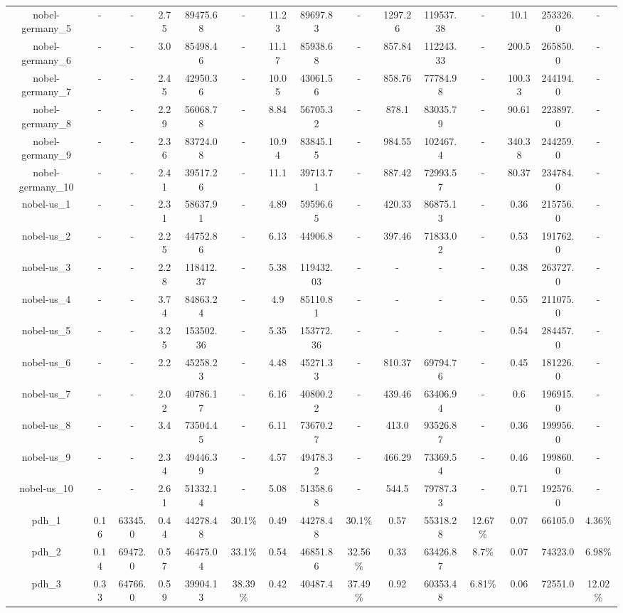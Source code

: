 \documentclass[main.tex]{subfiles}
\begin{document}
\begin{landscape}
\begin{table}[h]
{\begin{tabular}{c|cc|ccc|ccc|ccc|ccc}
	nobel-germany\_5 &- &- &2.75 &89475.68 &- &11.23 &89697.83 &- &1297.26 &119537.38 &- &10.1 &253326.0 &-\\
	nobel-germany\_6 &- &- &3.0 &85498.46 &- &11.17 &85938.68 &- &857.84 &112243.33 &- &200.5 &265850.0 &-\\
	nobel-germany\_7 &- &- &2.45 &42950.36 &- &10.05 &43061.56 &- &858.76 &77784.98 &- &100.33 &244194.0 &-\\
	nobel-germany\_8 &- &- &2.29 &56068.78 &- &8.84 &56705.32 &- &878.1 &83035.79 &- &90.61 &223897.0 &-\\
	nobel-germany\_9 &- &- &2.36 &83724.08 &- &10.94 &83845.15 &- &984.55 &102467.4 &- &340.38 &244259.0 &-\\
	nobel-germany\_10 &- &- &2.41 &39517.26 &- &11.1 &39713.71 &- &887.42 &72993.57 &- &80.37 &234784.0 &-\\
	nobel-us\_1 &- &- &2.31 &58637.91 &- &4.89 &59596.65 &- &420.33 &86875.13 &- &0.36 &215756.0 &-\\
	nobel-us\_2 &- &- &2.25 &44752.86 &- &6.13 &44906.8 &- &397.46 &71833.02 &- &0.53 &191762.0 &-\\
	nobel-us\_3 &- &- &2.28 &118412.37 &- &5.38 &119432.03 &- &- &- &- &0.38 &263727.0 &-\\
	nobel-us\_4 &- &- &3.74 &84863.24 &- &4.9 &85110.81 &- &- &- &- &0.55 &211075.0 &-\\
	nobel-us\_5 &- &- &3.25 &153502.36 &- &5.35 &153772.36 &- &- &- &- &0.54 &284457.0 &-\\
	nobel-us\_6 &- &- &2.2 &45258.23 &- &4.48 &45271.33 &- &810.37 &69794.76 &- &0.45 &181226.0 &-\\
	nobel-us\_7 &- &- &2.02 &40786.17 &- &6.16 &40800.22 &- &439.46 &63406.94 &- &0.6 &196915.0 &-\\
	nobel-us\_8 &- &- &3.4 &73504.45 &- &6.11 &73670.27 &- &413.0 &93526.87 &- &0.36 &199956.0 &-\\
	nobel-us\_9 &- &- &2.34 &49446.39 &- &4.57 &49478.32 &- &466.29 &73369.54 &- &0.46 &199860.0 &-\\
	nobel-us\_10 &- &- &2.61 &51332.14 &- &5.08 &51358.68 &- &544.5 &79787.33 &- &0.71 &192576.0 &-\\
	pdh\_1 &0.16 &63345.0 &0.44 &44278.48 &30.1\% &0.49 &44278.48 &30.1\% &0.57 &55318.28 &12.67\% &0.07 &66105.0 &4.36\%\\
	pdh\_2 &0.14 &69472.0 &0.57 &46475.04 &33.1\% &0.54 &46851.86 &32.56\% &0.33 &63426.87 &8.7\% &0.07 &74323.0 &6.98\%\\
	pdh\_3 &0.33 &64766.0 &0.59 &39904.13 &38.39\% &0.42 &40487.4 &37.49\% &0.92 &60353.48 &6.81\% &0.06 &72551.0 &12.02\%\\

\end{tabular}}
\end{table}
\end{landscape}
\end{document}
